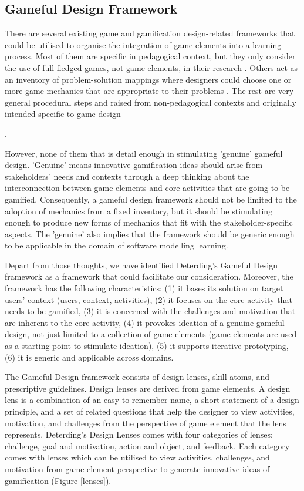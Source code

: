 \documentclass[12pt, a4paper]{report}
\begin{document}
\subsection{Gameful Design Framework}
There are several existing game and gamification design-related frameworks that could be utilised to organise the integration of game elements into a learning process. Most of them are specific in pedagogical context, but they only consider the use of full-fledged games, not game elements, in their research \cite{garris2002games, yusoff2009conceptual, de2011serious}. Others act as an inventory of problem-solution mappings where designers could choose one or more game mechanics that are appropriate to their problems \cite{arnab2015mapping, chou2013octalysis}. The rest are very general procedural steps and raised from non-pedagogical contexts \cite{werbach2012win, kumar2013framework, huang2013gamification} and originally intended specific to game design {\cite{hunicke2004mda}. 

However, none of them that is detail enough in stimulating 'genuine' gameful design. 'Genuine' means innovative gamification ideas should arise from stakeholders' needs and contexts through a deep thinking about the interconnection between game elements and core activities that are going to be gamified. Consequently, a gameful design framework should not be limited to the adoption of mechanics from a fixed inventory, but it should be stimulating enough to produce new forms of mechanics that fit with the stakeholder-specific aspects. The 'genuine' also implies that the framework should be generic enough to be applicable in the domain of software modelling learning.

Depart from those thoughts, we have identified Deterding's Gameful Design framework \cite{deterding2015lens} as a framework that could facilitate our consideration.  Moreover, the framework has the following characteristics: (1) it bases its solution on target users' context (users, context, activities), (2) it focuses on the core activity that needs to be gamified, (3) it is concerned with the challenges and motivation that are inherent to the core activity, (4) it provokes ideation of a genuine gameful design, not just limited to a collection of game elements (game elements are used as a starting point to stimulate ideation), (5) it supports iterative prototyping, (6) it is generic and applicable across domains.               

The Gameful Design framework consists of design lenses, skill atoms, and prescriptive guidelines. Design lenses are derived from game elements. A design lens is a combination of an easy-to-remember name, a short statement of a design principle, and a set of related questions that help the designer to view activities, motivation, and challenges from the perspective of game element that the lens represents. Deterding's Design Lenses comes with four categories of lenses: challenge, goal and motivation, action and object, and feedback. Each category comes with lenses which can be utilised to view activities, challenges, and motivation from game element perspective to generate innovative ideas of gamification (Figure \ref{lenses}). 

}
\end{document}
